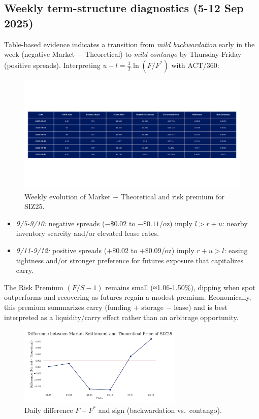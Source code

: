 \documentclass[11pt,a4paper]{article} %
\begin{document}
\subsection{Weekly term-structure diagnostics (5-12 Sep 2025)}
Table-based evidence indicates a transition from \emph{mild backwardation} early in the week (negative Market \(-\) Theoretical) to \emph{mild contango} by Thursday-Friday (positive spreads). Interpreting \(u-l=\tfrac{1}{T}\ln(F/F^{*})\) with ACT/360:

\begin{figure}[h]
\centering
\includegraphics[width=1\textwidth]{figures/silver_pricing_over_the_week.pdf}
\caption{Weekly evolution of Market \(-\) Theoretical and risk premium for SIZ25.}
\label{fig:silver_week}
\end{figure}

\begin{itemize}
  \item \textit{9/5-9/10:} negative spreads (\(-\$0.02\) to \(-\$0.11\)/oz) imply \(l>r+u\): nearby inventory scarcity and/or elevated lease rates.
  \item \textit{9/11-9/12:} positive spreads (\(+\$0.02\) to \(+\$0.09\)/oz) imply \(r+u>l\): easing tightness and/or stronger preference for futures exposure that capitalizes carry.
\end{itemize}
The Risk Premium \((F/S-1)\) remains small (≈1.06-1.50\%), dipping when spot outperforms and recovering as futures regain a modest premium. Economically, this premium summarizes carry (funding \(+\) storage \(-\) lease) and is best interpreted as a liquidity/carry effect rather than an arbitrage opportunity.

\begin{figure}[h]
\centering
\includegraphics[width=0.7\textwidth]{figures/silver_difference.pdf}
\caption{Daily difference \(F-F^{*}\) and sign (backwardation vs.\ contango).}
\label{fig:silver_difference}
\end{figure}
\end{document}
